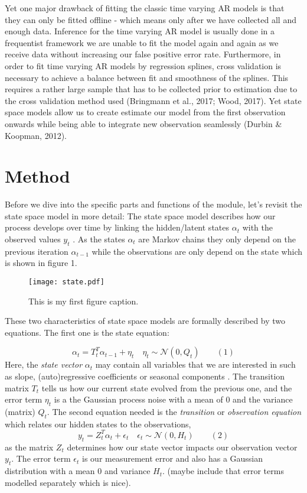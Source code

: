 \documentclass[a4paper, doc, natbib]{apa7}
\begin{document}
Yet one major drawback of fitting the classic time varying AR models is that they can only be fitted offline - which means only after we have collected all and enough data. Inference for the time varying AR model is usually done in a frequentist framework we are unable to fit the model again and again as we receive data without increasing our false positive error rate. Furthermore, in order to fit time varying AR models by regression splines, cross validation is necessary to achieve a balance between fit and smoothness of the splines. This requires a rather large sample that has to be collected prior to estimation due to the cross validation method used (Bringmann et al., 2017; Wood, 2017). Yet state space models allow us to create estimate our model from the first observation onwards while being able to integrate new observation seamlessly (Durbin & Koopman, 2012). 



\section{Method}
Before we dive into the specific parts and functions of the module, let's revisit the state space model in more detail: The state space model describes how our process develops over time by linking the hidden/latent states $\alpha_t$ with the observed values $y_t$ \citep{durbinTimeSeriesAnalysis2012}. As the states $\alpha_t$ are Markov chains they only depend on the previous iteration $\alpha_{t-1}$ while the observations are only depend on the state which is shown in figure 1. 


\begin{figure}
    \centering
    \caption{This is my first figure caption.}
    \texttt{[image: state.pdf]}
    \label{fig:Figure1}
\end{figure}


These two characteristics of state space models are formally described by two equations. The  first one is the state equation:

$$
\alpha_{t} = T_t^T \alpha_{t-1} + \eta_t \quad \eta_t \sim \mathcal{N}(0,Q_t) \quad \quad(1)
$$
Here, the \textit{state vector} $\alpha_t$ may contain all variables that we are interested in such as slope, (auto)regressive coefficients or seasonal components \citep{scottPredictingPresentBayesian2014}. The transition matrix $T_t$ tells us how our current state evolved from the previous one, and the error term $\eta_t$ is a the Gaussian process noise with a mean of 0 and the variance (matrix) $Q_t$. 
The second equation needed is the \textit{transition} or \textit{observation equation} which relates our hidden states to the observations,
$$
y_{t} = Z_t^T \alpha_{t} + \epsilon_t \quad \epsilon_t \sim \mathcal{N}(0,H_t) \quad \quad(2)
$$
as the matrix $Z_t$ determines how our state vector impacts our observation vector $y_t$. The error term $\epsilon_t$ is our measurement error and also has a Gaussian distribution with a mean 0 and variance $H_t$. (maybe include that error terms modelled separately which is nice).
\end{document}
